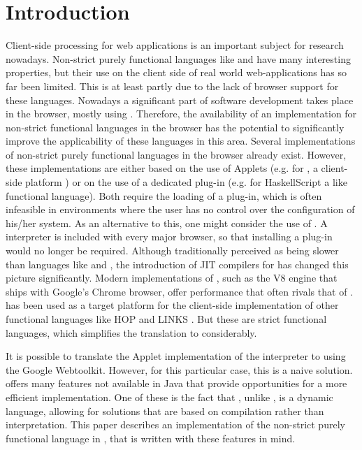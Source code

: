 \section{Introduction}\label{sapljs:sec:intro}
Client-side processing for  web applications is an important subject for research nowadays.
Non-strict purely functional languages like \Haskell \cite{Haskell} and \Clean \cite{Clean}
have many interesting properties, but their use on the client side of real world web-applications 
has so far been limited. 
This is at least partly due to the lack of browser support for these languages.
Nowadays a significant part of software development takes place in the browser, mostly 
using \JavaScript. 
Therefore, the availability of an implementation for non-strict functional languages 
in the browser has the potential to significantly 
improve the applicability of these languages in this area.
Several implementations of non-strict purely functional languages in the browser already exist. 
However, these implementations are either based on the use of \Java Applets 
(e.g. for \Sapl, a client-side \Clean platform  \cite{JKP,PJKA} )
or on the use of a dedicated plug-in 
(e.g. for \textsf{HaskellScript} \cite{HaskellScript} a \Haskell like functional language).
Both require the loading of a plug-in, which is often infeasible in environments where the user has no 
control over the 
configuration of his/her system. As an alternative to this, one might consider the use of \JavaScript. 
A \JavaScript interpreter is included with every major browser, so that installing a plug-in would no longer be required. 
Although traditionally perceived as being slower than languages like \Java and \C, the introduction of JIT compilers for \JavaScript has changed this picture significantly. 
Modern implementations of \JavaScript, such as the V8 engine that ships with Google's Chrome browser, offer performance that often rivals that of \Java.
\JavaScript has been used as a target platform for the client-side implementation of other functional languages like HOP and LINKS \cite{HOP1,HOP2,LINKS1}. But these are strict functional languages, which simplifies the translation to \JavaScript considerably.

It is possible to translate the \Java Applet implementation of the \Sapl interpreter to \JavaScript 
using the Google Webtoolkit. 
However, for this particular case, this is a naive solution. \JavaScript offers many features not available in Java that provide opportunities for a more efficient implementation. One of these is the fact that \JavaScript, unlike \Java, is a dynamic language, allowing for solutions that are based on compilation rather than interpretation. This paper describes an implementation of the non-strict purely functional language \Sapl in \JavaScript, that is written with these features in mind.

